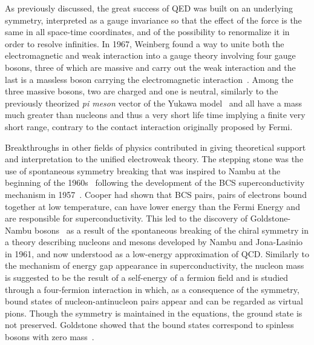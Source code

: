 	As previously discussed, the great success of QED was built on an underlying symmetry, interpreted as a gauge invariance so that the effect of the force is the same in all space-time coordinates, and of the possibility to renormalize it in order to resolve infinities. In 1967, Weinberg found a way to unite both the electromagnetic and weak interaction into a gauge theory involving four gauge bosons, three of which are massive and carry out the weak interaction and the last is a massless boson carrying the electromagnetic interaction~\cite{WEINBERG1967}. Among the three massive bosons, two are charged and one is neutral, similarly to the previously theorized \textit{pi meson} vector of the Yukawa model~\cite{YUKAWA1935} and all have a mass much greater than nucleons and thus a very short life time implying a finite very short range, contrary to the contact interaction originally proposed by Fermi.
	
	Breakthroughs in other fields of physics contributed in giving theoretical support and interpretation to the unified electroweak theory. The stepping stone was the use of spontaneous symmetry breaking that was inspired to Nambu at the beginning of the 1960s~\cite{NAMBU1961I,NAMBU1961II} following the development of the \acf{BCS} superconductivity mechanism in 1957~\cite{BCS1957}. Cooper had shown that BCS pairs, pairs of electrons bound together at low temperature, can have lower energy than the Fermi Energy and are responsible for superconductivity. This led to the discovery of Goldstone-Nambu bosons~\cite{NAMBU1960,GOLDSTONE1961} as a result of the spontaneous breaking of the chiral symmetry in a theory describing nucleons and mesons developed by Nambu and Jona-Lasinio in 1961, and now understood as a low-energy approximation of QCD. Similarly to the mechanism of energy gap appearance in superconductivity, the nucleon mass is suggested to be the result of a self-energy of a fermion field and is studied through a four-fermion interaction in which, as a consequence of the symmetry, bound states of nucleon-antinucleon pairs appear and can be regarded as virtual pions. Though the symmetry is maintained in the equations, the ground state is not preserved. Goldstone showed that the bound states correspond to spinless bosons with zero mass~\cite{GOLDSTONE1961}.
	
